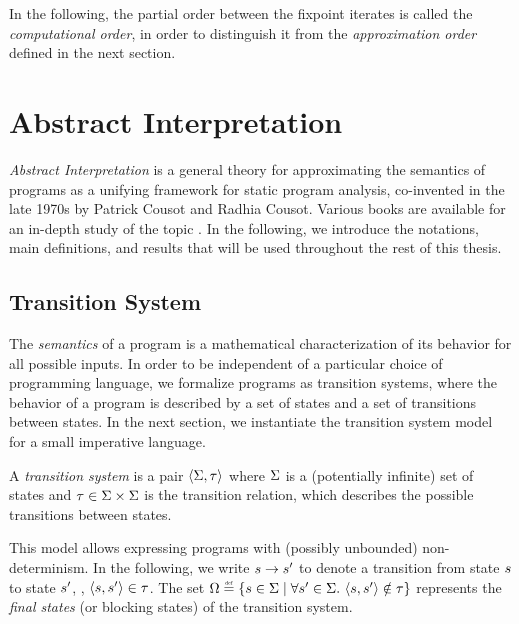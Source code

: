 In the following, the partial order between the fixpoint iterates is called the \emph{computational order}, in order to distinguish it from the \emph{approximation order} defined in the next section.


\section{Abstract Interpretation}

\emph{Abstract Interpretation}  is a general theory for approximating the semantics of programs as a unifying framework for static program analysis, co-invented in the late 1970s by Patrick Cousot and Radhia Cousot.
Various books are available for an in-depth study of the topic .
In the following, we introduce the notations, main definitions, and results that will be used throughout the rest of this thesis.

\subsection{Transition System}

The \emph{semantics} of a program is a mathematical characterization of its behavior for all possible inputs.
In order to be independent of a particular choice of programming language, we formalize programs as transition systems, where the behavior of a program is described by a set of states and a set of transitions between states.
In the next section, we instantiate the transition system model for a small imperative language.

\begin{definition}
  A \emph{transition system} is a pair $\langle \Sigma, \tau \rangle$ where $\Sigma$ is a (potentially infinite) set of states and $\tau \in \Sigma\times\Sigma$ is the transition relation, which describes the possible transitions between states.
\end{definition}

This model allows expressing programs with (possibly unbounded) non-determinism.
In the following, we write $s \rightarrow s'$ to denote a transition from state $s$ to state $s'$, \ie, $\langle s, s' \rangle \in \tau$.
The set $\finalstates \defeq \setdef{\defstate \in \state}{\forall \defstate' \in \state.\spacer \tuple{\defstate}{\defstate'} \notin \transitionrelation}$ represents the \emph{final states} (or blocking states) of the transition system.


